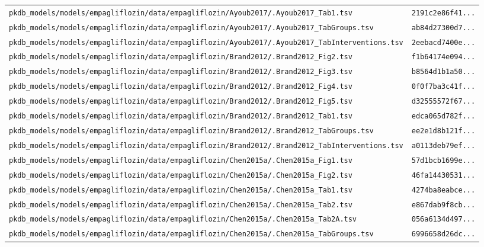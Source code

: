 \documentclass{article}
\begin{document}
\begin{longtable}{ll}
\texttt{pkdb\_models/models/empagliflozin/data/empagliflozin/Ayoub2017/.Ayoub2017\_Tab1.tsv} & \texttt{2191c2e86f41...} \\
\texttt{pkdb\_models/models/empagliflozin/data/empagliflozin/Ayoub2017/.Ayoub2017\_TabGroups.tsv} & \texttt{ab84d27300d7...} \\
\texttt{pkdb\_models/models/empagliflozin/data/empagliflozin/Ayoub2017/.Ayoub2017\_TabInterventions.tsv} & \texttt{2eebacd7400e...} \\
\texttt{pkdb\_models/models/empagliflozin/data/empagliflozin/Brand2012/.Brand2012\_Fig2.tsv} & \texttt{f1b64174e094...} \\
\texttt{pkdb\_models/models/empagliflozin/data/empagliflozin/Brand2012/.Brand2012\_Fig3.tsv} & \texttt{b8564d1b1a50...} \\
\texttt{pkdb\_models/models/empagliflozin/data/empagliflozin/Brand2012/.Brand2012\_Fig4.tsv} & \texttt{0f0f7ba3c41f...} \\
\texttt{pkdb\_models/models/empagliflozin/data/empagliflozin/Brand2012/.Brand2012\_Fig5.tsv} & \texttt{d32555572f67...} \\
\texttt{pkdb\_models/models/empagliflozin/data/empagliflozin/Brand2012/.Brand2012\_Tab1.tsv} & \texttt{edca065d782f...} \\
\texttt{pkdb\_models/models/empagliflozin/data/empagliflozin/Brand2012/.Brand2012\_TabGroups.tsv} & \texttt{ee2e1d8b121f...} \\
\texttt{pkdb\_models/models/empagliflozin/data/empagliflozin/Brand2012/.Brand2012\_TabInterventions.tsv} & \texttt{a0113deb79ef...} \\
\texttt{pkdb\_models/models/empagliflozin/data/empagliflozin/Chen2015a/.Chen2015a\_Fig1.tsv} & \texttt{57d1bcb1699e...} \\
\texttt{pkdb\_models/models/empagliflozin/data/empagliflozin/Chen2015a/.Chen2015a\_Fig2.tsv} & \texttt{46fa14430531...} \\
\texttt{pkdb\_models/models/empagliflozin/data/empagliflozin/Chen2015a/.Chen2015a\_Tab1.tsv} & \texttt{4274ba8eabce...} \\
\texttt{pkdb\_models/models/empagliflozin/data/empagliflozin/Chen2015a/.Chen2015a\_Tab2.tsv} & \texttt{e867dab9f8cb...} \\
\texttt{pkdb\_models/models/empagliflozin/data/empagliflozin/Chen2015a/.Chen2015a\_Tab2A.tsv} & \texttt{056a6134d497...} \\
\texttt{pkdb\_models/models/empagliflozin/data/empagliflozin/Chen2015a/.Chen2015a\_TabGroups.tsv} & \texttt{6996658d26dc...} \\

\end{longtable}
\end{document}

